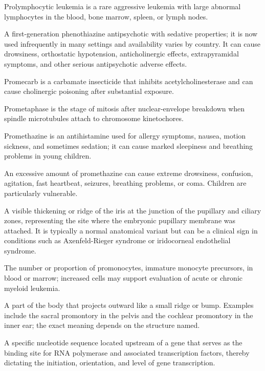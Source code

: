  Prolymphocytic leukemia is a rare aggressive leukemia with large abnormal lymphocytes in the blood, bone marrow, spleen, or lymph nodes.

 A first-generation phenothiazine antipsychotic with sedative properties; it is now used infrequently in many settings and availability varies by country. It can cause drowsiness, orthostatic hypotension, anticholinergic effects, extrapyramidal symptoms, and other serious antipsychotic adverse effects.

 Promecarb is a carbamate insecticide that inhibits acetylcholinesterase and can cause cholinergic poisoning after substantial exposure.

 Prometaphase is the stage of mitosis after nuclear-envelope breakdown when spindle microtubules attach to chromosome kinetochores.

 Promethazine is an antihistamine used for allergy symptoms, nausea, motion sickness, and sometimes sedation; it can cause marked sleepiness and breathing problems in young children.

 An excessive amount of promethazine can cause extreme drowsiness, confusion, agitation, fast heartbeat, seizures, breathing problems, or coma. Children are particularly vulnerable.

 A visible thickening or ridge of the iris at the junction of the pupillary and ciliary
zones, representing the site where the embryonic pupillary membrane was attached. It is
typically a normal anatomical variant but can be a clinical sign in conditions such as
Axenfeld-Rieger syndrome or iridocorneal endothelial syndrome.

 The number or proportion of promonocytes, immature monocyte precursors, in blood or marrow; increased cells may support evaluation of acute or chronic myeloid leukemia.

 A part of the body that projects outward like a small ridge or bump. Examples include the sacral promontory in the pelvis and the cochlear promontory in the inner ear; the exact meaning depends on the structure named.

 A specific nucleotide sequence located upstream of a gene that serves as the binding site for RNA polymerase and associated transcription factors, thereby dictating the initiation, orientation, and level of gene transcription.

